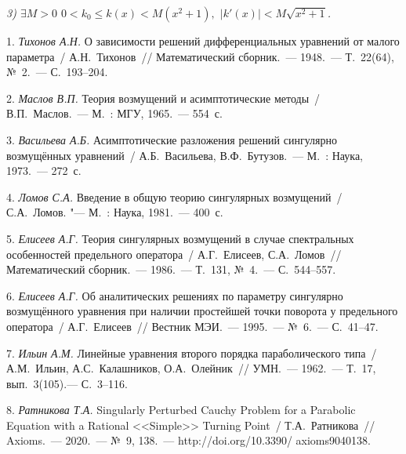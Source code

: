 {\it 3) $\exists M>0$ $0<k_0\leq k(x)<M(x^2+1),$ $|k'(x)|<M \sqrt{x^2+1}$.}

\noindent {\it Тогда $\exists \mathbb{C}>0$ $\forall(x,t)\in(-\infty,+\infty)\times[0,T]$ $\forall\varepsilon\in(0,\varepsilon_0]$ $|R_n(x,t,\varepsilon)|\le \mathbb{C}.$ }

\litlist


1. {\it Тихонов А.Н.} О зависимости решений дифференциальных уравнений от малого параметра~/ А.Н.~Тихонов~// Математический сборник.~--- 1948.~--- Т.~22(64), №~2.~--- С.~193--204.

2. {\it Маслов В.П.} Теория возмущений и асимптотические методы~/ В.П.~Маслов.~--- М.~: МГУ, 1965.~--- 554~с.

3. {\it Васильева А.Б.} Асимптотические разложения решений сингулярно возмущённых уравнений~/ А.Б.~Васильева, В.Ф.~Бутузов.~--- М.~: Наука, 1973.~--- 272~с.

4. {\it Ломов С.А.} Введение в общую теорию сингулярных возмущений~/ С.А.~Ломов. "--- М.~: Наука, 1981.~--- 400~с.

5. {\it Елисеев А.Г.} Теория сингулярных возмущений в случае спектральных особенностей предельного оператора~/ А.Г.~Елисеев, \linebreak С.А.~Ломов~// Математический сборник.~--- 1986.~--- Т.~131, №~4.~--- С.~544--557.

6. {\it Елисеев А.Г.} Об аналитических решениях по параметру сингулярно возмущённого уравнения при наличии простейшей точки поворота у предельного оператора~/ А.Г.~Елисеев~// Вестник МЭИ.~--- 1995.~--- №~6.~--- С.~41--47.

7. {\it Ильин А.М.} Линейные уравнения второго порядка параболического типа~/ А.М.~Ильин, А.С.~Калашников, О.А.~Олейник~// УМН.~--- 1962.~--- Т.~17, вып.~3(105).--- С.~3--116.

8. {\it Ратникова Т.А.} \foreignlanguage{english}{Singularly Perturbed Cauchy Problem for a Parabolic Equation with a Rational <<Simple>> Turning Point}~/ Т.А.~Ратникова~// \foreignlanguage{english}{Axioms}.~--- 2020.~--- №~9, 138.~--- http://doi.org/10.3390/ axioms9040138.

